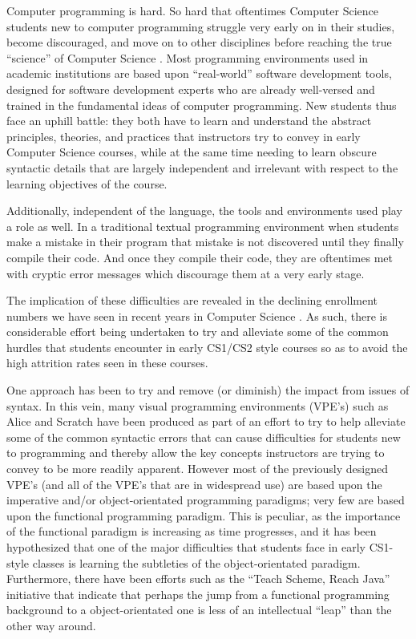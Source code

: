 \label{chapter:introduction}

Computer programming is hard.  So hard that oftentimes Computer Science students new to computer programming struggle
very early on in their studies, become discouraged, and move on to other disciplines before reaching the true ``science'' of Computer Science \cite{Beaubouef05}.  Most programming environments used in academic institutions are based upon ``real-world'' software development tools, designed for software development experts who are already well-versed and trained in the fundamental ideas of computer programming.  New students thus face an uphill battle: they both have to learn and understand the abstract principles, theories, and practices that instructors try to convey in early Computer Science courses, while at the same time needing to learn obscure syntactic details that are largely independent and irrelevant with respect to the learning objectives of the course.

Additionally, independent of the language, the tools and environments used play a role as well.  In a traditional textual programming environment when students make a mistake in their program that mistake is not discovered until they finally compile their code.  And once they compile their code, they are oftentimes met with cryptic error messages which discourage them at a very early stage\cite{jenkins02,Hundhausen09,Kelleher05}.

The implication of these difficulties are revealed in the declining enrollment numbers we have seen in recent years in Computer Science \cite{Manaris07,Vesgo07,Ward08,Bayliss09}.  As such, there is considerable effort being undertaken to try and alleviate some of the common hurdles that students encounter in early CS1/CS2 style courses so as to avoid the high attrition rates seen in these courses.

One approach has been to try and remove (or diminish) the impact from issues of syntax.  In this vein, many visual programming environments (VPE's) such as Alice\cite{alice} and Scratch\cite{scratch} have been produced as part of an effort to try to help alleviate some of the common syntactic errors that can cause difficulties for students new to programming and thereby allow the key concepts instructors are trying to convey to be more readily apparent.  However most of the previously designed VPE's (and all of the VPE's that are in widespread use) are based upon the imperative and/or object-orientated programming paradigms; very few are based upon the functional programming paradigm.  This is peculiar, as the importance of the functional paradigm is increasing as time progresses, and it has been hypothesized that one of the major difficulties that students face in early CS1-style classes is learning the subtleties of the object-orientated paradigm\cite{Manaris07,Mahmoud04,Benander04}. Furthermore, there have been efforts such as the ``Teach Scheme, Reach Java'' initiative \cite{Bloch08,teachScheme,Felleisen04} that indicate that perhaps the jump from a functional programming background to a object-orientated one is less of an intellectual ``leap'' than the other way around\cite{Huch05}.

